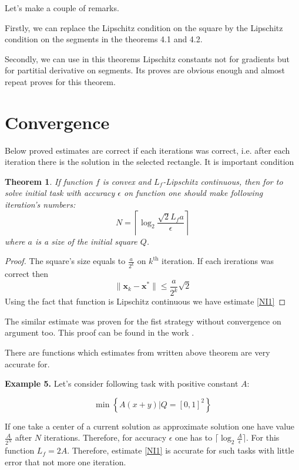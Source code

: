 \documentclass[12pt]{article}
\newtheorem{theorem}{Theorem}[section]
\begin{document}
Let's make a couple of remarks.

Firstly, we can replace the Lipschitz condition on the square by the Lipschitz condition on the segments in the theorems 4.1 and 4.2.

Secondly, we can use in this theorems Lipschitz constants not for gradients but for partitial derivative on segments. Its proves are obvious enough and almost repeat proves for this theorem.

\section{Convergence}

Below proved estimates are correct if each iterations was correct, i.e. after each iteration there is the solution in the selected rectangle. It is important condition

\begin{theorem}
If function $f$ is convex and $L_f$-Lipschitz continuous, then for to solve initial task with accuracy $\epsilon$ on function one should make following iteration's numbers:
\begin{equation}\label{NI1}N = \left\lceil\log_2\frac{\sqrt{2}L_fa}{\epsilon}\right\rceil\end{equation}
where $a$ is a size of the initial square $Q$.
\end{theorem}

\begin{proof}
The square's size equals to $\frac{a}{2^k}$ on $k^\text{th}$ iteration. If each irerations was correct then
$$\|\textbf{x}_k-\textbf{x}^*\|\leq \frac{a}{2^k}\sqrt{2}$$
Using the fact that function is Lipschitz continuous we have estimate \ref{NI1}
\end{proof}

The similar estimate was proven for the fist strategy without convergence on argument too. This proof can be found in the work \cite{Ston_Pas}.

There are functions which estimates from written above theorem are very accurate for.

\textbf{Example 5.} Let's consider following task with positive constant $A$:

$$\min\left\{A(x+y)|Q = [0,1]^2\right\}$$

If one take a center of a current solution as approximate  solution one have value $\frac{A}{2^N}$ after $N$ iterations. Therefore, for accuracy $\epsilon$ one has to $\lceil\log_2\frac{A}{\epsilon}\rceil$. For this function $L_f = 2A$. Therefore, estimate \eqref{NI1} is accurate for such tasks with little error that not more one iteration.
\end{document}
